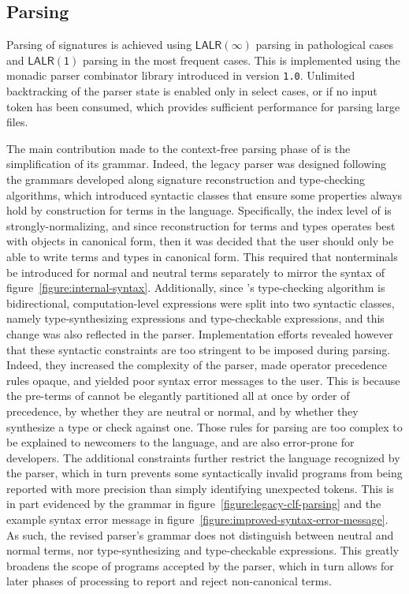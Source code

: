 \subsection{Parsing}

Parsing of \Beluga signatures is achieved using $ \mathsf{LALR(\infty)} $ parsing in pathological cases and $ \mathsf{LALR(1)} $ parsing in the most frequent cases.
This is implemented using the monadic parser combinator library introduced in \Beluga version \texttt{1.0}.
Unlimited backtracking of the parser state is enabled only in select cases, or if no input token has been consumed, which provides sufficient performance for parsing large \Beluga files.

The main contribution made to the context-free parsing phase of \Beluga is the simplification of its grammar.
Indeed, the legacy parser was designed following the grammars developed along signature reconstruction and type-checking algorithms, which introduced syntactic classes that ensure some properties always hold by construction for terms in the language.
Specifically, the index level \LF of \Beluga is strongly-normalizing, and since reconstruction for \LF terms and types operates best with objects in canonical form, then it was decided that the user should only be able to write \LF terms and types in canonical form.
This required that nonterminals be introduced for normal and neutral terms separately to mirror the syntax of figure~\ref{figure:internal-syntax}.
Additionally, since \Beluga's type-checking algorithm is bidirectional, computation-level expressions were split into two syntactic classes, namely type-synthesizing expressions and type-checkable expressions, and this change was also reflected in the parser.
Implementation efforts revealed however that these syntactic constraints are too stringent to be imposed during parsing.
Indeed, they increased the complexity of the parser, made operator precedence rules opaque, and yielded poor syntax error messages to the user.
This is because the pre-terms of \Beluga cannot be elegantly partitioned all at once by order of precedence, by whether they are neutral or normal, and by whether they synthesize a type or check against one.
Those rules for parsing are too complex to be explained to newcomers to the language, and are also error-prone for developers.
The additional constraints further restrict the language recognized by the parser, which in turn prevents some syntactically invalid programs from being reported with more precision than simply identifying unexpected tokens.
This is in part evidenced by the grammar in figure~\ref{figure:legacy-clf-parsing} and the example syntax error message in figure~\ref{figure:improved-syntax-error-message}.
As such, the revised parser's grammar does not distinguish between neutral and normal terms, nor type-synthesizing and type-checkable expressions.
This greatly broadens the scope of programs accepted by the parser, which in turn allows for later phases of processing to report and reject non-canonical terms.

